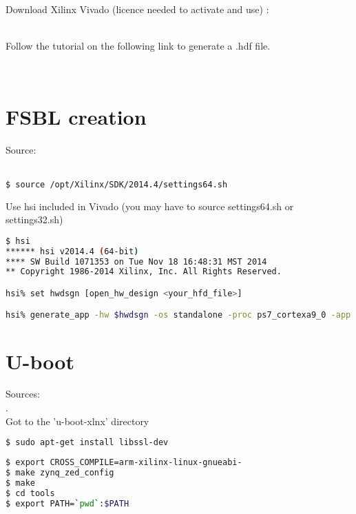 Download Xilinx Vivado (licence needed to activate and use) :\\
\\ \vspace{5pt}

Follow the tutorial on the following link to generate a .hdf file.\vspace{.8em}

\\

\section{FSBL creation}
Source:\\
\\ \vspace{5pt}

\begin{lstlisting}[language=bash]
$ source /opt/Xilinx/SDK/2014.4/settings64.sh
\end{lstlisting}

Use hsi included in Vivado (you may have to source settings64.sh or settings32.sh)\\

\begin{lstlisting}[language=bash]
$ hsi
****** hsi v2014.4 (64-bit)
**** SW Build 1071353 on Tue Nov 18 16:48:31 MST 2014
** Copyright 1986-2014 Xilinx, Inc. All Rights Reserved.

hsi% set hwdsgn [open_hw_design <your_hfd_file>]

hsi% generate_app -hw $hwdsgn -os standalone -proc ps7_cortexa9_0 -app zynq_fsbl -compile -sw fsbl -dir <directory_for_new_app>
\end{lstlisting}


\section{U-boot}
Sources:\\
.\\

Got to the 'u-boot-xlnx' directory \\

\begin{lstlisting}[language=bash]
$ sudo apt-get install libssl-dev
\end{lstlisting}


\begin{lstlisting}[language=bash]
$ export CROSS_COMPILE=arm-xilinx-linux-gnueabi-
$ make zynq_zed_config
$ make
$ cd tools
$ export PATH=`pwd`:$PATH
\end{lstlisting}

